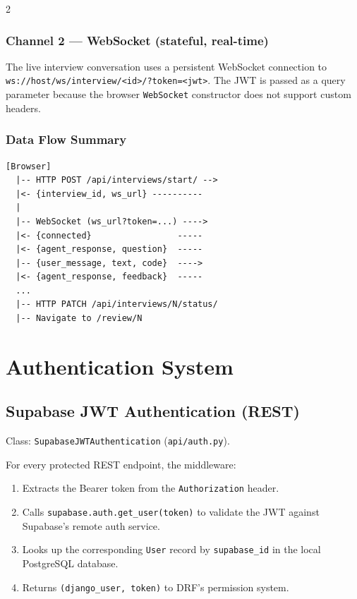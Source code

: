 \documentclass[10pt, a4paper]{article}
\begin{document}
\begin{multicols}{2}
\subsubsection{Channel 2 --- WebSocket (stateful, real-time)}
The live interview conversation uses a persistent WebSocket connection to
\texttt{ws://host/ws/interview/<id>/?token=<jwt>}. The JWT is passed as a
query parameter because the browser \texttt{WebSocket} constructor does not
support custom headers.

\subsubsection{Data Flow Summary}
\begin{codebox}
\footnotesize
\begin{verbatim}
[Browser]
  |-- HTTP POST /api/interviews/start/ -->
  |<- {interview_id, ws_url} ----------
  |
  |-- WebSocket (ws_url?token=...) ---->
  |<- {connected}                 -----
  |<- {agent_response, question}  -----
  |-- {user_message, text, code}  ---->
  |<- {agent_response, feedback}  -----
  ...
  |-- HTTP PATCH /api/interviews/N/status/
  |-- Navigate to /review/N
\end{verbatim}
\end{codebox}

\section{Authentication System}

\subsection{Supabase JWT Authentication (REST)}
Class: \texttt{SupabaseJWTAuthentication}
(\texttt{api/auth.py}).

For every protected REST endpoint, the middleware:
\begin{enumerate}
  \item Extracts the Bearer token from the \texttt{Authorization} header.
  \item Calls \texttt{supabase.auth.get\_user(token)} to validate the JWT
        against Supabase's remote auth service.
  \item Looks up the corresponding \texttt{User} record by \texttt{supabase\_id}
        in the local PostgreSQL database.
  \item Returns \texttt{(django\_user, token)} to DRF's permission system.
\end{enumerate}


\end{multicols}
\end{document}
